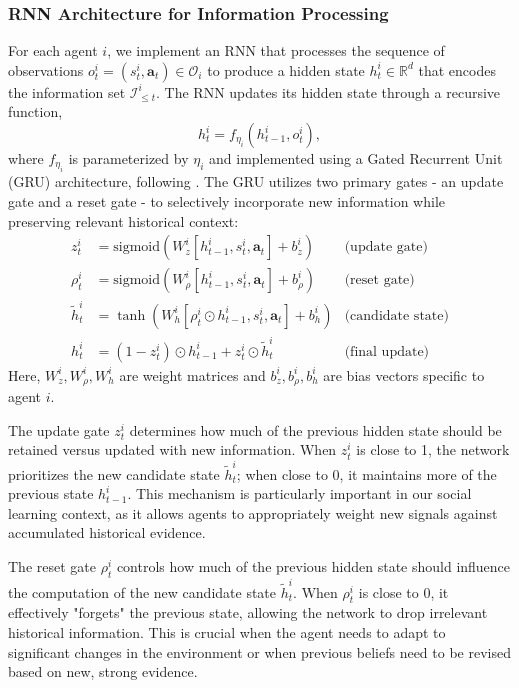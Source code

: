 \subsubsection*{RNN Architecture for Information Processing}
For each agent $i$, we implement an RNN that processes the sequence of observations $o_t^i = (s_t^i, \mathbf{a}_t) \in \mathcal{O}_i$ to produce a hidden state $h_t^i \in \mathbb{R}^d$ that encodes the information set $\mathcal{I}_{\leq t}^i$. The RNN updates its hidden state through a recursive function,
\begin{equation*}
h_t^i = f_{\eta_i}(h_{t-1}^i, o_t^i),
\end{equation*}
where $f_{\eta_i}$ is parameterized by $\eta_i$ and implemented using a Gated Recurrent Unit (GRU) architecture, following \cite{cho2014learning}. The GRU utilizes two primary gates - an update gate and a reset gate - to selectively incorporate new information while preserving relevant historical context:
\begin{align*}
z_t^i &= \text{sigmoid}(W_z^i[h_{t-1}^i, s_t^i, \mathbf{a}_t] + b_z^i) & \text{(update gate)} \\
\rho_t^i &= \text{sigmoid}(W_\rho^i[h_{t-1}^i, s_t^i, \mathbf{a}_t] + b_\rho^i) & \text{(reset gate)} \\
\tilde{h}_t^i &= \tanh(W_h^i[\rho_t^i \odot h_{t-1}^i, s_t^i, \mathbf{a}_t] + b_h^i) & \text{(candidate state)} \\
h_t^i &= (1-z_t^i) \odot h_{t-1}^i + z_t^i \odot \tilde{h}_t^i & \text{(final update)}
\end{align*}
Here, $W_z^i, W_\rho^i, W_h^i$ are weight matrices and $b_z^i, b_\rho^i, b_h^i$ are bias vectors specific to agent $i$.

The update gate $z_t^i$ determines how much of the previous hidden state should be retained versus updated with new information. When $z_t^i$ is close to 1, the network prioritizes the new candidate state $\tilde{h}_t^i$; when close to 0, it maintains more of the previous state $h_{t-1}^i$. This mechanism is particularly important in our social learning context, as it allows agents to appropriately weight new signals against accumulated historical evidence.

The reset gate $\rho_t^i$ controls how much of the previous hidden state should influence the computation of the new candidate state $\tilde{h}_t^i$. When $\rho_t^i$ is close to 0, it effectively "forgets" the previous state, allowing the network to drop irrelevant historical information. This is crucial when the agent needs to adapt to significant changes in the environment or when previous beliefs need to be revised based on new, strong evidence.

